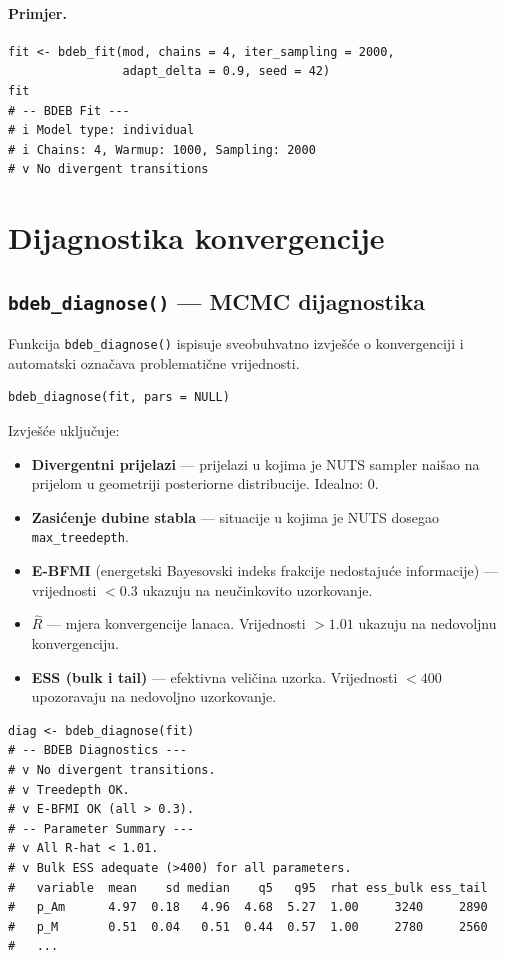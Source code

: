 \documentclass[11pt,a4paper]{article}
\newcommand{\fn}[1]{\texttt{#1()}}
\newcommand{\code}[1]{\texttt{#1}}
\begin{document}
\paragraph{Primjer.}
\begin{lstlisting}
fit <- bdeb_fit(mod, chains = 4, iter_sampling = 2000,
                adapt_delta = 0.9, seed = 42)
fit
# -- BDEB Fit ---
# i Model type: individual
# i Chains: 4, Warmup: 1000, Sampling: 2000
# v No divergent transitions
\end{lstlisting}


\section{Dijagnostika konvergencije}
\label{sec:dijagnostika}

\subsection{\fn{bdeb\_diagnose} --- MCMC dijagnostika}

Funkcija \fn{bdeb\_diagnose} ispisuje sveobuhvatno izvješće o
konvergenciji i automatski označava problematične vrijednosti.

\begin{lstlisting}
bdeb_diagnose(fit, pars = NULL)
\end{lstlisting}

Izvješće uključuje:
\begin{itemize}[nosep]
  \item \textbf{Divergentni prijelazi} --- prijelazi u kojima je NUTS
    sampler naišao na prijelom u geometriji posteriorne distribucije.  Idealno: 0.
  \item \textbf{Zasićenje dubine stabla} --- situacije u kojima je NUTS
    dosegao \code{max\_treedepth}.
  \item \textbf{E-BFMI} (energetski Bayesovski indeks frakcije nedostajuće
    informacije) --- vrijednosti $< 0.3$ ukazuju na neučinkovito
    uzorkovanje.
  \item \textbf{$\hat{R}$} --- mjera konvergencije lanaca.  Vrijednosti
    $> 1.01$ ukazuju na nedovoljnu konvergenciju.
  \item \textbf{ESS (bulk i tail)} --- efektivna veličina uzorka.
    Vrijednosti $< 400$ upozoravaju na nedovoljno uzorkovanje.
\end{itemize}

\begin{lstlisting}
diag <- bdeb_diagnose(fit)
# -- BDEB Diagnostics ---
# v No divergent transitions.
# v Treedepth OK.
# v E-BFMI OK (all > 0.3).
# -- Parameter Summary ---
# v All R-hat < 1.01.
# v Bulk ESS adequate (>400) for all parameters.
#   variable  mean    sd median    q5   q95  rhat ess_bulk ess_tail
#   p_Am      4.97  0.18   4.96  4.68  5.27  1.00     3240     2890
#   p_M       0.51  0.04   0.51  0.44  0.57  1.00     2780     2560
#   ...
\end{lstlisting}
\end{document}
